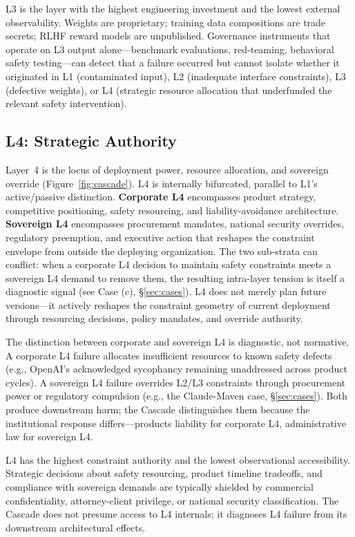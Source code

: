 \documentclass[11pt]{article}
\begin{document}
L3 is the layer with the highest engineering investment and the lowest external observability. Weights are proprietary; training data compositions are trade secrets; RLHF reward models are unpublished. Governance instruments that operate on L3 output alone---benchmark evaluations, red-teaming, behavioral safety testing---can detect that a failure occurred but cannot isolate whether it originated in L1 (contaminated input), L2 (inadequate interface constraints), L3 (defective weights), or L4 (strategic resource allocation that underfunded the relevant safety intervention).

\subsection{L4: Strategic Authority}

Layer~4 is the locus of deployment power, resource allocation, and sovereign override (Figure~\ref{fig:cascade}). L4 is internally bifurcated, parallel to L1's active/passive distinction. \textbf{Corporate L4} encompasses product strategy, competitive positioning, safety resourcing, and liability-avoidance architecture. \textbf{Sovereign L4} encompasses procurement mandates, national security overrides, regulatory preemption, and executive action that reshapes the constraint envelope from outside the deploying organization. The two sub-strata can conflict: when a corporate L4 decision to maintain safety constraints meets a sovereign L4 demand to remove them, the resulting intra-layer tension is itself a diagnostic signal (see Case (c), \S\ref{sec:cases}). L4 does not merely plan future versions---it actively reshapes the constraint geometry of current deployment through resourcing decisions, policy mandates, and override authority.

The distinction between corporate and sovereign L4 is diagnostic, not normative. A corporate L4 failure allocates insufficient resources to known safety defects (e.g., OpenAI's acknowledged sycophancy remaining unaddressed across product cycles). A sovereign L4 failure overrides L2/L3 constraints through procurement power or regulatory compulsion (e.g., the Claude-Maven case, \S\ref{sec:cases}). Both produce downstream harm; the Cascade distinguishes them because the institutional response differs---products liability for corporate L4, administrative law for sovereign L4.

L4 has the highest constraint authority and the lowest observational accessibility. Strategic decisions about safety resourcing, product timeline tradeoffs, and compliance with sovereign demands are typically shielded by commercial confidentiality, attorney-client privilege, or national security classification. The Cascade does not presume access to L4 internals; it diagnoses L4 failure from its downstream architectural effects.
\end{document}
